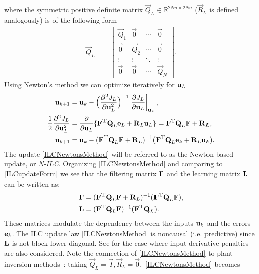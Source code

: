 \noindent where the symmetric positive definite matrix $\vec{Q}_L \in \mathbb{R}^{2Nn \times 2Nn}$ ($\vec{R}_L$ is defined analogously) is of the following form
%
\begin{equation}
\begin{aligned}
 \vec{Q}_L &= 
 \begin{bmatrix}
  \vec{Q}_1 & \vec{0} & \cdots & \vec{0} \\
  \vec{0} & \vec{Q}_2 & \cdots & \vec{0} \\
  \vdots  & \vdots  & \ddots & \vdots  \\
  \vec{0} & \vec{0} & \cdots & \vec{Q}_N
 \end{bmatrix}.
\end{aligned}
\label{Qmatrix}
\end{equation}
%
\noindent Using Newton's method we can optimize iteratively for $\boldsymbol{\mathrm{u}}_L$
%
\begin{equation}
\begin{aligned}
\boldsymbol{\mathrm{u}}_{k+1} &= \boldsymbol{\mathrm{u}}_k - \Big(\frac{\partial^{2}J_L}{\partial\boldsymbol{\mathrm{u}}^{2}_L}\Big)^{-1}\left.\frac{\partial{J_L}}{\partial{\boldsymbol{\mathrm{u}}_L}}\right|_{\boldsymbol{\mathrm{u}}_k}, \\
\frac{1}{2}\frac{\partial^{2}J_L}{\partial\boldsymbol{\mathrm{u}}^{2}_L} &= \frac{\partial}{\partial\boldsymbol{\mathrm{u}}_L}\{\boldsymbol{\mathrm{F}}^{\mathrm{T}}\boldsymbol{\mathrm{Q}}_L\boldsymbol{\mathrm{e}}_L + \boldsymbol{\mathrm{R}}_L\boldsymbol{\mathrm{u}}_L\} = \boldsymbol{\mathrm{F}}^{\mathrm{T}}\boldsymbol{\mathrm{Q}}_L\boldsymbol{\mathrm{F}} + \boldsymbol{\mathrm{R}}_L, \\
\boldsymbol{\mathrm{u}}_{k+1} &= \boldsymbol{\mathrm{u}}_k - (\boldsymbol{\mathrm{F}}^{\mathrm{T}}\boldsymbol{\mathrm{Q}}_L\boldsymbol{\mathrm{F}} + \boldsymbol{\mathrm{R}}_L)^{-1}(\boldsymbol{\mathrm{F}}^{\mathrm{T}}\boldsymbol{\mathrm{Q}}_L\boldsymbol{\mathrm{e}}_k + \boldsymbol{\mathrm{R}}_L\boldsymbol{\mathrm{u}}_k).
\end{aligned}
\label{ILCNewtonsMethod}
\end{equation}
%
\noindent The update \eqref{ILCNewtonsMethod} will be referred to as the Newton-based update, or \emph{N-ILC}. Organizing \eqref{ILCNewtonsMethod} and comparing to \eqref{ILCupdateForm} we see that the filtering matrix $\boldsymbol{\mathrm{\Gamma}}$ and the learning matrix $\boldsymbol{\mathrm{L}}$ can be written as:
%
\begin{equation}
\begin{aligned}
\boldsymbol{\mathrm{\Gamma}} &= (\boldsymbol{\mathrm{F}}^{\mathrm{T}}\boldsymbol{\mathrm{Q}}_L\boldsymbol{\mathrm{F}} + \boldsymbol{\mathrm{R}}_L)^{-1}(\boldsymbol{\mathrm{F}}^{\mathrm{T}}\boldsymbol{\mathrm{Q}}_L\boldsymbol{\mathrm{F}}),\\
\boldsymbol{\mathrm{L}} &= (\boldsymbol{\mathrm{F}}^{\mathrm{T}}\boldsymbol{\mathrm{Q}}_L\boldsymbol{\mathrm{F}})^{-1}(\boldsymbol{\mathrm{F}}^{\mathrm{T}}\boldsymbol{\mathrm{Q}}_L).
\end{aligned}
\label{qAndlMatrices}
\end{equation}
%
\noindent These matrices modulate the dependency between the inputs $\boldsymbol{\mathrm{u}}_k$ and the errors $\boldsymbol{\mathrm{e}}_k$. The ILC update law \eqref{ILCNewtonsMethod} is noncausal (i.e. predictive) since $\boldsymbol{\mathrm{L}}$ is not block lower-diagonal. See \cite{Amann95,Gunnarsson01} for the case where input derivative penalties are also considered. Note the connection of \eqref{ILCNewtonsMethod} to plant inversion methods~\cite{Bristow06}: taking $\vec{Q}_L = \vec{I}, \vec{R}_{L} = \vec{0},$ \eqref{ILCNewtonsMethod} becomes
